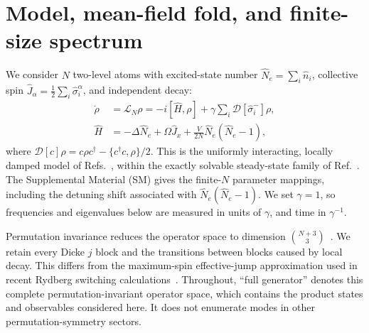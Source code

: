 \documentclass[aps,pra,twocolumn,superscriptaddress,amsmath,amssymb,reprint,floatfix]{revtex4-2}
\newcommand{\Lc}{\mathcal L}
\begin{document}
\section{Model, mean-field fold, and finite-size spectrum}
\label{sec:model}
We consider $N$ two-level atoms with excited-state number $\hat N_e=\sum_i\hat n_i$, collective spin $\hat J_\alpha=\frac12\sum_i\hat\sigma_i^\alpha$, and independent decay:
\begin{align}
 \dot\rho&=\Lc_N\rho=-i[\hat H,\rho]
 +\gamma\sum_i\mathcal D[\hat\sigma_i^-]\rho,\label{eq:L}\\
 \hat H&=-\Delta\hat N_e+\Omega\hat J_x
 +\frac{V}{2N}\hat N_e(\hat N_e-1),\label{eq:H}
\end{align}
where $\mathcal D[c]\rho=c\rho c^\dagger-\{c^\dagger c,\rho\}/2$. This is the uniformly interacting, locally damped model of Refs.~\cite{Lee2012,LeeChan2013}, within the exactly solvable steady-state family of Ref.~\cite{RobertsClerk2023}. The Supplemental Material (SM) gives the finite-$N$ parameter mappings, including the detuning shift associated with $\hat N_e(\hat N_e-1)$. We set $\gamma=1$, so frequencies and eigenvalues below are measured in units of $\gamma$, and time in $\gamma^{-1}$.

Permutation invariance reduces the operator space to dimension $\binom{N+3}{3}$~\cite{Shammah2018}. We retain every Dicke $j$ block and the transitions between blocks caused by local decay. This differs from the maximum-spin effective-jump approximation used in recent Rydberg switching calculations~\cite{Xiang2026}. Throughout, ``full generator'' denotes this complete permutation-invariant operator space, which contains the product states and observables considered here. It does not enumerate modes in other permutation-symmetry sectors.
\end{document}
